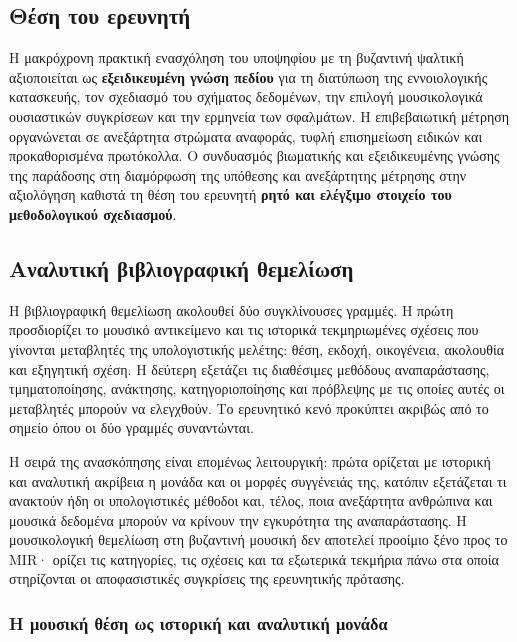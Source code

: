 \documentclass[11pt,a4paper]{article}
\begin{document}
\subsection{Θέση του ερευνητή}\label{app:corpora-researcher}

Η μακρόχρονη πρακτική ενασχόληση του υποψηφίου με τη βυζαντινή ψαλτική αξιοποιείται ως \textbf{εξειδικευμένη γνώση πεδίου} για τη διατύπωση της εννοιολογικής κατασκευής, τον σχεδιασμό του σχήματος δεδομένων, την επιλογή μουσικολογικά ουσιαστικών συγκρίσεων και την ερμηνεία των σφαλμάτων. Η επιβεβαιωτική μέτρηση οργανώνεται σε ανεξάρτητα στρώματα αναφοράς, τυφλή επισημείωση ειδικών και προκαθορισμένα πρωτόκολλα. Ο συνδυασμός βιωματικής και εξειδικευμένης γνώσης της παράδοσης στη διαμόρφωση της υπόθεσης και ανεξάρτητης μέτρησης στην αξιολόγηση καθιστά τη θέση του ερευνητή \textbf{ρητό και ελέγξιμο στοιχείο του μεθοδολογικού σχεδιασμού}.



\subsection{Αναλυτική βιβλιογραφική θεμελίωση}\label{app:literature-full}

Η βιβλιογραφική θεμελίωση ακολουθεί δύο συγκλίνουσες γραμμές. Η πρώτη προσδιορίζει το μουσικό αντικείμενο και τις ιστορικά τεκμηριωμένες σχέσεις που γίνονται μεταβλητές της υπολογιστικής μελέτης: θέση, εκδοχή, οικογένεια, ακολουθία και εξηγητική σχέση. Η δεύτερη εξετάζει τις διαθέσιμες μεθόδους αναπαράστασης, τμηματοποίησης, ανάκτησης, κατηγοριοποίησης και πρόβλεψης με τις οποίες αυτές οι μεταβλητές μπορούν να ελεγχθούν. Το ερευνητικό κενό προκύπτει ακριβώς από το σημείο όπου οι δύο γραμμές συναντώνται.

Η σειρά της ανασκόπησης είναι επομένως λειτουργική: πρώτα ορίζεται με ιστορική και αναλυτική ακρίβεια η μονάδα και οι μορφές συγγένειάς της, κατόπιν εξετάζεται τι ανακτούν ήδη οι υπολογιστικές μέθοδοι και, τέλος, ποια ανεξάρτητα ανθρώπινα και μουσικά δεδομένα μπορούν να κρίνουν την εγκυρότητα της αναπαράστασης. Η μουσικολογική θεμελίωση στη βυζαντινή μουσική δεν αποτελεί προοίμιο ξένο προς το MIR· ορίζει τις κατηγορίες, τις σχέσεις και τα εξωτερικά τεκμήρια πάνω στα οποία στηρίζονται οι αποφασιστικές συγκρίσεις της ερευνητικής πρότασης.

\subsubsection{Η μουσική θέση ως ιστορική και αναλυτική μονάδα}
\end{document}
